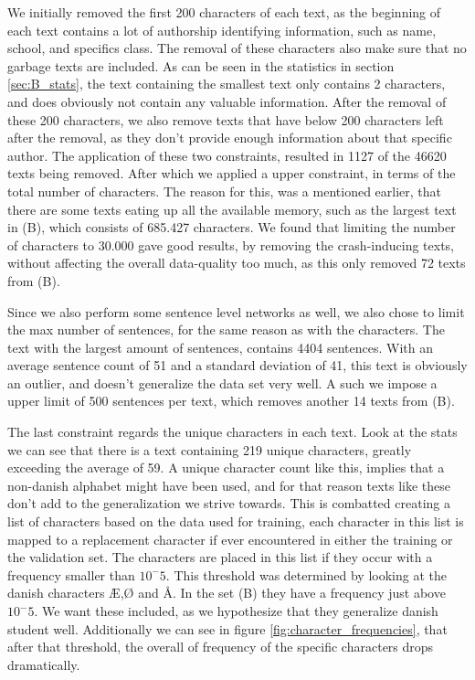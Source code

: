 We initially removed the first 200 characters of each text, as the beginning
of each text contains a lot of authorship identifying information, such as
name, school, and specifics class. The removal of these characters also make
sure that no garbage texts are included. As can be seen in the statistics in
section \ref{sec:B_stats}, the text containing the smallest text only contains
2 characters, and does obviously not contain any valuable information. After
the removal of these 200 characters, we also remove texts that have below 200
characters left after the removal, as they don't provide enough information
about that specific author. The application of these two constraints, resulted
in 1127 of the 46620 texts being removed. After which we applied a upper
constraint, in terms of the total number of characters. The reason for this,
was a mentioned earlier, that there are some texts eating up all the available
memory, such as the largest text in (B), which consists of 685.427 characters.
We found that limiting the number of characters to 30.000 gave good results, by
removing the crash-inducing texts, without affecting the overall data-quality
too much, as this only removed 72 texts from (B).

Since we also perform some sentence level networks as well, we also chose to
limit the max number of sentences, for the same reason as with the characters.
The text with the largest amount of sentences, contains 4404 sentences. With
an average sentence count of 51 and a standard deviation of 41, this text is
obviously an outlier, and doesn't generalize the data set very well. A such we
impose a upper limit of 500 sentences per text, which removes another 14 texts
from (B).

The last constraint regards the unique characters in each text. Look at the
stats we can see that there is a text containing 219 unique characters, greatly
exceeding the average of 59. A unique character count like this, implies that a
non-danish alphabet might have been used, and for that reason texts like these
don't add to the generalization we strive towards. This is combatted creating
a list of characters based on the data used for training, each character in
this list is mapped to a replacement character if ever encountered in either
the training or the validation set. The characters are placed in this list if
they occur with a frequency smaller than $10^-5$. This threshold was determined
by looking at the danish characters Æ,Ø and Å. In the set (B) they have
a frequency just above $10^-5$. We want these included, as we hypothesize
that they generalize danish student well. Additionally we can see in figure
\ref{fig:character_frequencies}, that after that threshold, the overall of
frequency of the specific characters drops dramatically.

